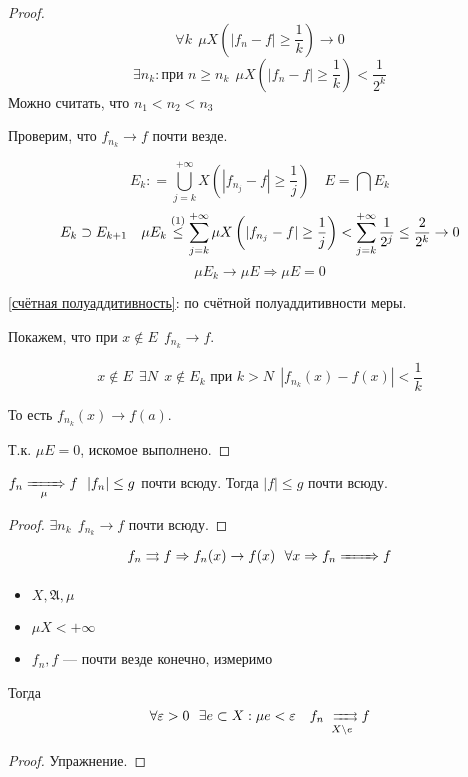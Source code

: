 \begin{proof}
    \[\forall k \ \ \mu X\left(|f_n - f| \geq \frac{1}{k}\right) \to 0\]
    \[\exists n_k : \text{при } n \geq n_k \ \ \mu X\left( |f_n - f| \geq \frac{1}{k} \right) < \frac{1}{2^k}\]
    Можно считать, что \(n_1 < n_2 < n_3\)

    Проверим, что \(f_{n_k} \to f\) почти везде.

    \[E_k : = \bigcup_{j = k}^{+\infty} X\left( |f_{n_j} - f| \geq \frac{1}{j} \right) \quad E = \bigcap E_k\]
    \[E_k \supset E_{k+1} \quad \mu E_k \symref{счётная полуаддитивность}{\leq} \sum_{j = k}^{+\infty} \mu X\left( |f_{n_j} - f| \geq \frac{1}{j} \right) < \sum_{j = k}^{+\infty} \frac{1}{2^j} \leq \frac{2}{2^k} \to 0\]
    \[\mu E_k \to \mu E \Rightarrow \mu E = 0\]

    \ref{счётная полуаддитивность}: по счётной полуаддитивности меры.


    Покажем, что при \(x\not\in E \ \ f_{n_k} \to f\).

    \[x\not\in E \ \ \exists N \ \ x\not\in E_k \text{ при } k > N \ \ |f_{n_k}(x) - f(x)|< \frac{1}{k}\]

    То есть \(f_{n_k}(x) \to f(a)\).

    Т.к. \(\mu E = 0\), искомое выполнено.
\end{proof}
\begin{corollary}
    \(f_n \xRightarrow[\mu]{\qquad} f \ \ |f_n| \leq g\) почти всюду. Тогда \(|f| \leq g\) почти всюду.
\end{corollary}
\begin{proof}
    \(\exists n_k \ \ f_{n_k} \to f\) почти всюду.

\end{proof}

\[f_n \rightrightarrows f  \Rightarrow f_n(x) \to f(x) \ \  \forall x \Rightarrow f_n \xRightarrow[]{\qquad} f\]

\begin{theorem}[Егорова]\itemfix
    \begin{itemize}
        \item \(X, \mathfrak{A}, \mu\)
        \item \(\mu X < +\infty\)
        \item \(f_n, f\) --- почти везде конечно, измеримо
    \end{itemize}

    Тогда
    \[\forall \varepsilon > 0 \ \ \exists e\subset X : \mu e < \varepsilon \quad f_n \xrightrightarrows[X\setminus e]{} f\]
\end{theorem}
\begin{proof}
    Упражнение. %
\end{proof}

